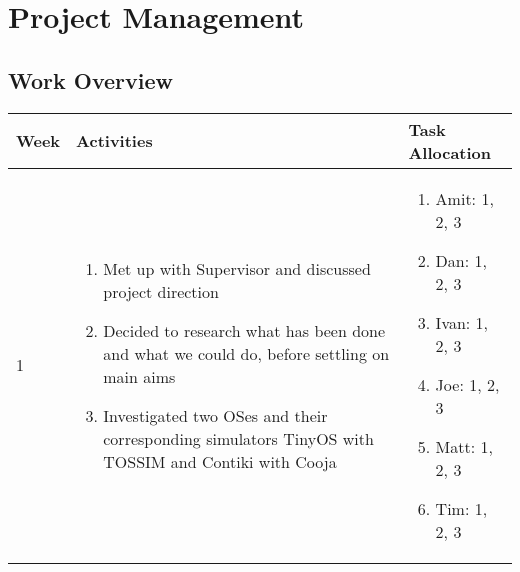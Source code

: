 \section{Project Management}

\subsection{Work Overview}

\begin{table}[H]
	\centering
	\begin{tabular}{| l | p{7.5cm} | p{5cm} |}
	Week & Activities & Task Allocation\\
	\hline
	1 & \begin{enumerate}
			\item Met up with Supervisor and discussed project direction
			\item Decided to research what has been done and what we could do, before settling on main aims
			\item Investigated two OSes and their corresponding simulators TinyOS with TOSSIM and Contiki with Cooja
		\end{enumerate} &
	\begin{enumerate}
		\item[] Amit: 1, 2, 3
		\item[] Dan: 1, 2, 3
		\item[] Ivan: 1, 2, 3
		\item[] Joe: 1, 2, 3
		\item[] Matt: 1, 2, 3
		\item[] Tim: 1, 2, 3
	\end{enumerate}
	\\ \hline


\end{tabular}
\end{table}
